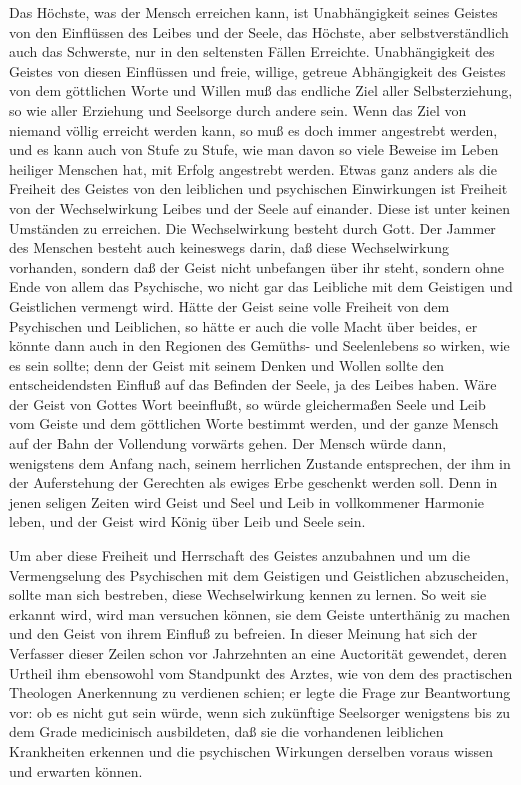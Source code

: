 Das Höchste, was der Mensch erreichen kann, ist Unabhängigkeit seines Geistes von den Einflüssen des Leibes und der Seele, das Höchste, aber selbstverständlich auch das Schwerste, nur in den seltensten Fällen Erreichte. Unabhängigkeit des Geistes von diesen Einflüssen und freie, willige, getreue Abhängigkeit des Geistes von dem göttlichen Worte und Willen muß das endliche Ziel aller Selbsterziehung, so wie aller Erziehung und Seelsorge durch andere sein. Wenn das Ziel von niemand völlig erreicht werden kann, so muß es doch immer angestrebt werden, und es kann auch von Stufe zu Stufe, wie man davon so viele Beweise im Leben heiliger Menschen hat, mit Erfolg angestrebt werden. Etwas ganz anders als die Freiheit des Geistes von den leiblichen und psychischen Einwirkungen ist Freiheit von der Wechselwirkung Leibes und der Seele auf einander. Diese ist unter keinen Umständen zu erreichen. Die Wechselwirkung besteht durch Gott. Der Jammer des Menschen besteht auch keineswegs darin, daß diese Wechselwirkung vorhanden, sondern daß der
Geist nicht unbefangen über ihr steht, sondern ohne Ende von allem das Psychische, wo nicht gar das Leibliche mit dem Geistigen und Geistlichen vermengt wird. Hätte der Geist seine volle Freiheit von dem Psychischen und Leiblichen, so hätte er auch die volle Macht über beides, er könnte dann auch in den Regionen des Gemüths- und Seelenlebens so wirken, wie es sein sollte; denn der Geist mit seinem Denken und Wollen sollte den entscheidendsten Einfluß auf das Befinden der Seele, ja des Leibes haben. Wäre der Geist von Gottes Wort beeinflußt, so würde gleichermaßen Seele und Leib vom Geiste und dem göttlichen Worte bestimmt werden, und der ganze Mensch auf der Bahn der Vollendung vorwärts gehen. Der Mensch würde dann, wenigstens dem Anfang nach, seinem herrlichen Zustande entsprechen, der ihm in der Auferstehung der Gerechten als ewiges Erbe geschenkt werden soll. Denn in jenen seligen Zeiten wird Geist und Seel und Leib in vollkommener Harmonie leben, und der Geist wird König über Leib und Seele sein.

Um aber diese Freiheit und Herrschaft des Geistes anzubahnen und um die Vermengselung des Psychischen mit dem Geistigen und Geistlichen abzuscheiden, sollte man sich bestreben, diese Wechselwirkung kennen zu lernen. So weit sie erkannt wird, wird man versuchen können, sie dem Geiste unterthänig zu machen und den Geist von ihrem Einfluß zu befreien. In dieser Meinung hat sich der Verfasser dieser Zeilen schon vor Jahrzehnten an eine Auctorität gewendet, deren Urtheil ihm ebensowohl vom Standpunkt des Arztes, wie von
dem des practischen Theologen Anerkennung zu verdienen schien; er legte die Frage zur Beantwortung vor: ob es nicht gut sein würde, wenn sich zukünftige Seelsorger wenigstens bis zu dem Grade medicinisch ausbildeten, daß sie die vorhandenen leiblichen Krankheiten erkennen und die psychischen Wirkungen derselben voraus wissen und erwarten können.

